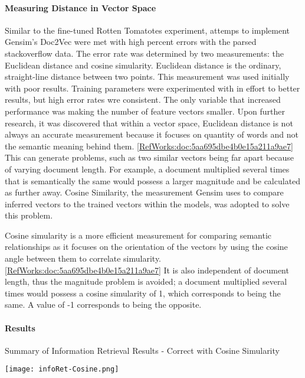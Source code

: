 \paragraph{Measuring Distance in Vector Space} Similar to the fine-tuned Rotten Tomatotes experiment, attemps to implement Gensim's Doc2Vec were met with high percent errors with the parsed stackoverflow data. The error rate was determined by two measurements: the Euclidean distance and cosine simularity. Euclidean distance is the ordinary, straight-line distance between two points. This measurement was used initially with poor results. Training parameters were experimented with in effort to better results, but high error rates wre consistent. The only variable that increased performance was making the number of feature vectors smaller. Upon further research, it was discovered that within a vector space, Euclidean distance is not always an accurate measurement because it focuses on quantity of words and not the semantic meaning behind them. \ref{RefWorks:doc:5aa695dbe4b0e15a211a9ae7} This can generate problems, such as two similar vectors being far apart because of varying document length. For example, a document multiplied several times that is semantically the same would possess a larger magnitude and be calculated as further away. Cosine Similarity, the measurement Gensim uses to compare inferred vectors to the trained vectors within the models, was adopted to solve this problem.

Cosine simularity is a more efficient measurement for comparing semantic relationships as it focuses on the orientation of the vectors by using the cosine angle between them to correlate simularity. \ref{RefWorks:doc:5aa695dbe4b0e15a211a9ae7} It is also independent of document length, thus the magnitude problem is avoided; a document multiplied several times would possess a cosine simularity of 1, which corresponds to being the same. A value of -1 corresponds to being the opposite. 

\paragraph{Results}

\begin{table}[ht]
\caption{Summary of Information Retrieval Results - Correct with Cosine Simularity}
\label{results_of_information_retrieval_cosine}
\centering
\texttt{[image: infoRet-Cosine.png]}
\end{table}

